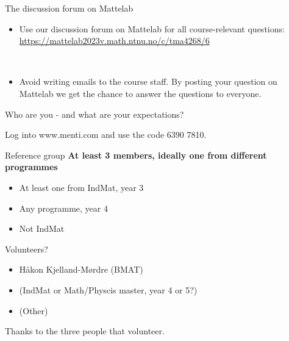 \documentclass[
  10pt,
  ignorenonframetext,
]{beamer}
\providecommand{\tightlist}{%
  \setlength{\itemsep}{0pt}\setlength{\parskip}{0pt}}
\begin{document}
\begin{frame}
\begin{block}{The discussion forum on Mattelab}
\protect\hypertarget{the-discussion-forum-on-mattelab}{}
\(~\)

\begin{itemize}
\tightlist
\item
  Use our discussion forum on Mattelab for all course-relevant
  questions: \url{https://mattelab2023v.math.ntnu.no/c/tma4268/6}
\end{itemize}

\(~\)

\begin{itemize}
\tightlist
\item
  Avoid writing emails to the course staff. By posting your question on
  Mattelab we get the chance to answer the questions to everyone.
\end{itemize}
\end{block}
\end{frame}

\begin{frame}{Who are you - and what are your expectations?}
\protect\hypertarget{who-are-you---and-what-are-your-expectations}{}
\(~\)

Log into www.menti.com and use the code 6390 7810.
\end{frame}

\begin{frame}{Reference group}
\protect\hypertarget{reference-group}{}
\textbf{At least 3 members, ideally one from different programmes}

\begin{itemize}
\tightlist
\item
  At least one from IndMat, year 3
\item
  Any programme, year 4
\item
  Not IndMat
\end{itemize}

Volunteers?

\begin{itemize}
\tightlist
\item
  Håkon Kjelland-Mørdre (BMAT)
\item
  (IndMat or Math/Physcis master, year 4 or 5?)
\item
  (Other)
\end{itemize}

Thanks to the three people that volunteer.
\end{frame}
\end{document}
